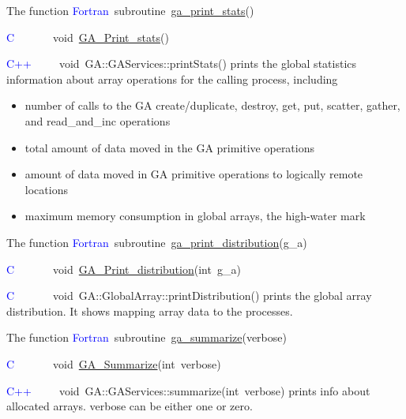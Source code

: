 The function
\textcolor{blue}{Fortran}~subroutine~\href{http://www.emsl.pnl.gov/docs/global/ga_ops.html\#ga_print_stats}{ga\_{}print\_{}stats}()~

\textcolor{blue}{C}~~~~~~~void~\href{http://www.emsl.pnl.gov/docs/global/c_nga_ops.html\#ga_print_stats}{GA\_{}Print\_{}stats}()~

\textcolor{blue}{C++}~~~~~void~GA::GAServices::printStats()
prints the global statistics information about array operations for
the calling process, including
\begin{itemize}
\item number of calls to the GA create/duplicate, destroy, get, put, scatter,
gather, and read\_and\_inc operations 
\item total amount of data moved in the GA primitive operations 
\item amount of data moved in GA primitive operations to logically remote
locations 
\item maximum memory consumption in global arrays, the \textquotedbl{}high-water
mark\textquotedbl{}
\end{itemize}
The function
\textcolor{blue}{Fortran}~subroutine~\href{http://www.emsl.pnl.gov/docs/global/ga_ops.html\#ga_print_distribution}{ga\_{}print\_{}distribution}(g\_a)~

\textcolor{blue}{C~}~~~~~~void~\href{http://www.emsl.pnl.gov/docs/global/c_nga_ops.html\#ga_print_distribution}{GA\_{}Print\_{}distribution}(int~g\_a)

\textcolor{blue}{C}~~~~~~~void~GA::GlobalArray::printDistribution()
prints the global array distribution. It shows mapping array data
to the processes.

The function
\textcolor{blue}{Fortran}~subroutine~\href{http://www.emsl.pnl.gov/docs/global/ga_ops.html\#ga_summarize}{ga\_{}summarize}(verbose)~

\textcolor{blue}{C~}~~~~~~void~\href{http://www.emsl.pnl.gov/docs/global/c_nga_ops.html\#ga_summarize}{GA\_{}Summarize}(int~verbose)~

\textcolor{blue}{C++}~~~~~void~GA::GAServices::summarize(int~verbose)
prints info about allocated arrays. verbose can be either one or zero. 


